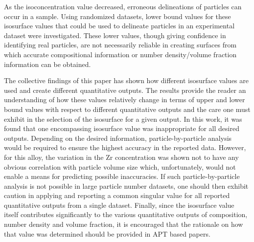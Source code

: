 	As the isoconcentration value decreased, erroneous delineations of particles can occur in a sample. Using randomized datasets, lower bound values for these isosurface values that could be used to delineate particles in an experimental dataset were investigated. These lower values, though giving confidence in identifying real particles, are not necessarily reliable in creating surfaces from which accurate compositional information or number density/volume fraction information can be obtained. 

	The collective findings of this paper has shown how different isosurface values are used and create different quantitative outputs. The results provide the reader an understanding of how these values relatively change in terms of upper and lower bound values with respect to different quantitative outputs and the care one must exhibit in the selection of the isosurface for a given output. In this work, it was found that one encompassing isosurface value was inappropriate for all desired outputs. Depending on the desired information, particle-by-particle analysis would be required to ensure the highest accuracy in the reported data. However, for this alloy, the variation in the Zr concentration was shown not to have any obvious correlation with particle volume size which, unfortunately, would not enable a means for predicting possible inaccuracies. If such particle-by-particle analysis is not possible in large particle number datasets, one should then exhibit caution in applying and reporting a common singular value for all reported quantitative outputs from a single dataset. Finally, since the isosurface value itself contributes significantly to the various quantitative outputs of composition, number density and volume fraction, it is encouraged that the rationale on how that value was determined should be provided in APT based papers. 
